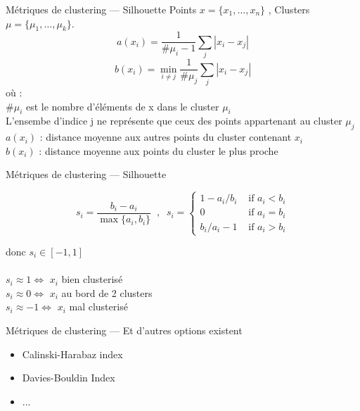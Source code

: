 \begin{frame}{Métriques de clustering --- Silhouette}
  Points $x = \{x_1, \dotsc, x_n\}$ , Clusters $\mu = \{\mu_1, \dotsc, \mu_k\}$. \\
  \[
  \boxed{a(x_i) = \frac{1}{\#\mu_i-1}\sum_j |x_i - x_j|}
  \]
  \[
  \boxed{b(x_i) = \min_{i \neq j} \frac{1}{\#\mu_j}\sum_j |x_i - x_j|}
  \]
  où : \\
  $\#\mu_i$ est le nombre d'éléments de x dans le cluster $\mu_i$ \\
  L'ensembe d'indice j ne représente que ceux des points appartenant au cluster $\mu_j$ \\
  $a(x_i)$ : distance moyenne aux autres points du cluster contenant $x_i$ \\
  $b(x_i)$ : distance moyenne aux points du cluster le plus proche
  
\end{frame}

\begin{frame}{Métriques de clustering --- Silhouette}
  
  \begin{center}
    \[
    s_i = \frac{b_i - a_i}{\max\{a_i, b_i\}}\;\;,\;\;
    s_i = \left\{
    \begin{array}{ll}
      1 - a_i/b_i & \mbox{ if } a_i < b_i \\[2mm]
      0 & \mbox{ if } a_i = b_i \\[2mm]
      b_i / a_i - 1 & \mbox{ if } a_i > b_i
    \end{array}\right.
    \]
    
  \end{center}
  donc $s_i \in [-1, 1]$ \\
  \\
  $s_i \approx 1 \iff$ $x_i$ bien clusterisé \\
  $s_i \approx 0 \iff$ $x_i$ au bord de 2 clusters\\
  $s_i \approx -1 \iff$ $x_i$ mal clusterisé
\end{frame}

\begin{frame}{Métriques de clustering --- Et d'autres options existent}
  \begin{itemize}
  \item Calinski-Harabaz index
  \item Davies-Bouldin Index
  \item ...
  \end{itemize}
\end{frame}

